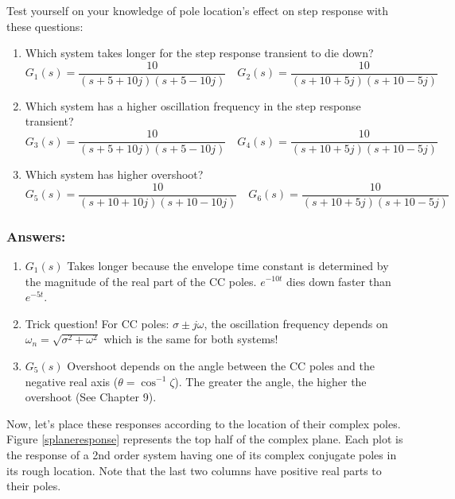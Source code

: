 \begin{Example}
  Test yourself on your knowledge of pole location's effect on step response with these questions:
  \begin{enumerate}
    \item  Which system takes longer for the step response transient to die down?
    \[
    G_1(s) = \frac{10}{(s+5+10j)(s+5-10j)} \quad G_2(s) = \frac{10}{(s+10+5j)(s+10-5j)}
    \]
    \item  Which system has a higher oscillation frequency in the step response transient?
    \[
    G_3(s) = \frac{10}{(s+5+10j)(s+5-10j)} \quad G_4(s) = \frac{10}{(s+10+5j)(s+10-5j)}
    \]

    \item Which system has higher overshoot?
    \[
    G_5(s) = \frac{10}{(s+10+10j)(s+10-10j)} \quad G_6(s) = \frac{10}{(s+10+5j)(s+10-5j)}
    \]
  \end{enumerate}


  \subsubsection*{Answers:}
  \begin{enumerate}
    \item $G_1(s)$  Takes longer because the envelope time constant is determined by the magnitude of
    the real part of the CC poles.   $e^{-10t}$ dies down faster than $e^{-5t}$.

    \item Trick question!   For CC poles: $\sigma \pm j\omega$, the oscillation frequency depends on $\omega_n = \sqrt{\sigma^2+\omega^2}$
    which is the same for both systems!

    \item $G_5(s)$ Overshoot depends on the angle between the CC poles and the negative real axis ($\theta = \cos^{-1}{\zeta}$).
    The greater the angle, the higher the overshoot (See Chapter 9).
  \end{enumerate}
\end{Example}



Now, let's place these responses according to the location of their complex poles.  Figure \ref{splaneresponse} represents the top half of the complex plane.   Each plot is the response of a 2nd order system having one of its complex conjugate poles in its rough location.  Note that the last two columns have positive real parts to their poles.



